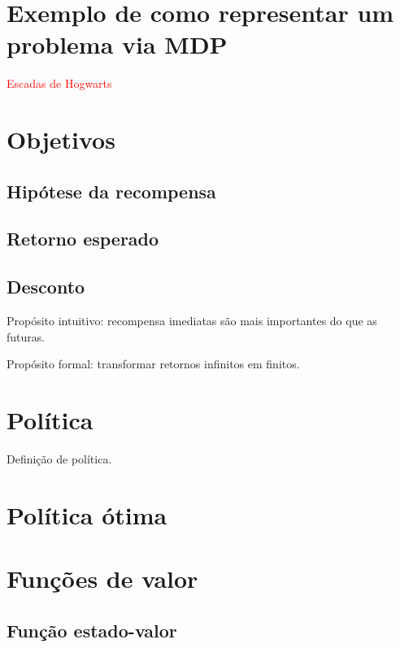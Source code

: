 \documentclass{article}
\begin{document}
    \section{Exemplo de como representar um problema via MDP}
    
        \textcolor{red}{Escadas de Hogwarts}
    
    \section{Objetivos}
    
        \subsection{Hipótese da recompensa}
    
        \subsection{Retorno esperado}
        
        \subsection{Desconto}
        
            Propósito intuitivo: recompensa imediatas são mais importantes do que as futuras.
            
            Propósito formal: transformar retornos infinitos em finitos.
        
    \section{Política}
    
        Definição de política.
    
        \section{Política ótima}
        
    
    \section{Funções de valor}
        
        \subsection{Função estado-valor}
        
\end{document}
